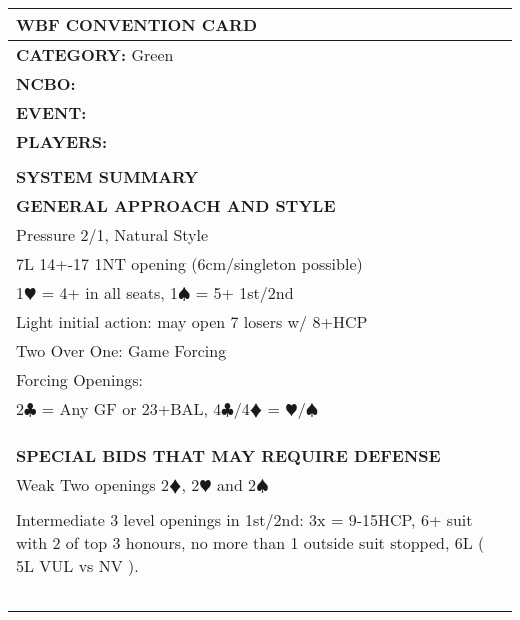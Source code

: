 \documentclass{article}
\newcommand\C{\ensuremath{\clubsuit}}
\newcommand\D{\color{red}\ensuremath{\vardiamondsuit}}
\renewcommand\H{\color{red}\ensuremath{\varheartsuit}}
\renewcommand\S{\ensuremath{\spadesuit}}
\newcommand\N{{\footnotesize NT}}
\begin{document}
\begin{minipage}{5mm}
	\begin{tabular}{| p{5mm} |}
	\end{tabular}
\end{minipage}
\begin{minipage}{90mm}
	\begin{tabular}{| p{88mm} |}
		\hline
		\cellcolor{green!25} \textbf{WBF CONVENTION CARD} \\ \hline
		\textbf{CATEGORY:} Green\\
		\textbf{NCBO:} \\
		\textbf{EVENT:} \\
		\textbf{PLAYERS:}  \\
		\multirow{2}{*}{} \\
		\\
		\hline \cellcolor{green!25} \textbf{SYSTEM SUMMARY} \\ \hline
		\cellcolor{orange!25}\textbf{GENERAL APPROACH AND STYLE} \\ \hline
		Pressure 2/1, Natural Style\\ \hline
		7L 14+-17 1{\N} opening (6cm/singleton possible)\\ \hline
		1{\H} = 4+ in all seats, 1{\S} = 5+ 1st/2nd\\ \hline
		Light initial action: may open 7 losers w/ 8+HCP\\ \hline
		Two Over One: Game Forcing\\ \hline
		Forcing Openings:\\ \hline
		{2\C} = Any GF or 23+BAL, 4{\C}/4{\D} = {\H}/{\S} \\ \hline
		\\ \hline
		\\ \hline
		\\ \hline
		\cellcolor{orange!25}\textbf{SPECIAL BIDS THAT MAY REQUIRE DEFENSE} \\ \hline
		Weak Two openings 2{\D}, 2{\H} and 2{\S}\\ \hline
		\\ \hline
		Intermediate 3 level openings in 1st/2nd: 
		3x = 9-15HCP, 6+ suit with 2 of top 3 honours,
		no more than 1 outside suit stopped, 6L ( 5L VUL vs NV ).\\ \hline
		\\ \hline
		\\ \hline
		\\ \hline
		\\ \hline
		\\ \hline


\end{tabular}
\end{minipage}
\end{document}
